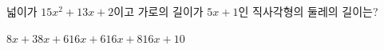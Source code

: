 넓이가 $15x^2+13x+2$이고 가로의 길이가 $5x+1$인 직사각형의 둘레의 길이는?
\begin{choices32}{$8x+3$}{$8x+6$}{$16x+6$}{$16x+8$}{$16x+10$}\end{choices32}
